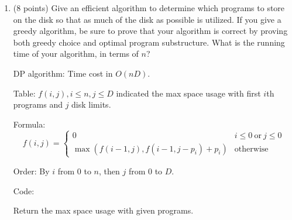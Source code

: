 \documentclass[paper=a4, fontsize=11pt]{scrartcl} %
\begin{document}
\begin{enumerate}
\item
  \begin{fancyquotes}
    (8 points) Give an efficient algorithm to determine which
    programs to store on the disk so that as much of the disk as
    possible is utilized. If you give a greedy algorithm, be sure to
    prove that your algorithm is correct by proving both greedy
    choice and optimal program substructure. What is the running time
    of your algorithm, in terms of $n$?
  \end{fancyquotes}

  DP algorithm: Time cost in $O(nD)$.

  Table:
  $f(i,j), i\leq n, j\leq D$ indicated the max space usage with first
  $i$th programs and $j$ disk limits.

  Formula:
  \begin{equation*}
    f(i,j) =
    \begin{cases}
      0 & i\leq 0\ \text{or}\ j\leq 0\\
      \max(f(i-1,j), f(i-1,j-p_i)+p_i) & \text{otherwise}
    \end{cases}
  \end{equation*}

  Order:
  By $i$ from $0$ to $n$, then $j$ from $0$ to $D$.

  Code:
  \begin{algorithm}[H]
    \caption{Return the max space usage with given programs.}
  \end{algorithm}

\end{enumerate}
\pagebreak

\section{}
\end{document}
